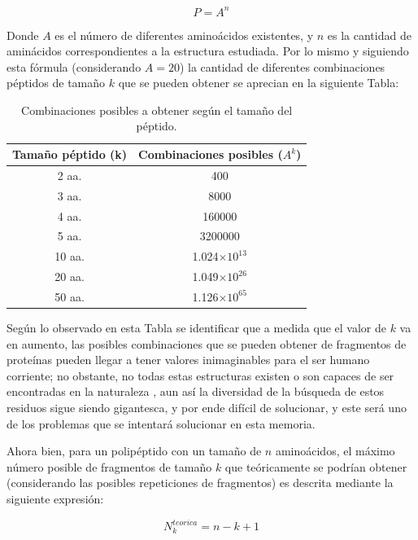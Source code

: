 \begin{equation}
P=A^{n}
\end{equation}

Donde $A$ es el número de diferentes aminoácidos existentes, y $n$ es la cantidad de aminácidos correspondientes a la estructura estudiada. Por lo mismo y siguiendo esta fórmula (considerando $A=20$) la cantidad de diferentes combinaciones péptidos de tamaño $k$ que se pueden obtener se aprecian en la siguiente Tabla:

\begin{table}[H]
\centering
\label{my-label2}
\begin{tabular}{|c|c|}
\hline
Tamaño péptido (k) & \multicolumn{1}{c|}{Combinaciones posibles ($A^{k}$)}  \\ \hline
2 aa.     & 400        \\
3 aa.     & 8000                         \\
4 aa.      &      160000                             \\
5 aa.      &   3200000       \\
10 aa.      &   1.024$\times 10^{13}$       \\
20 aa.      &   1.049$\times 10^{26}$       \\
50 aa.   &     1.126$\times 10^{65}$   \\ \hline
\end{tabular}
\caption{Combinaciones posibles a obtener según el tamaño del péptido.}
\end{table}

Según lo observado en esta Tabla se identificar que a medida que el valor de $k$ va en aumento, las posibles combinaciones que se pueden obtener de fragmentos de proteínas pueden llegar a tener valores inimaginables para el ser humano corriente; no obstante, no todas estas estructuras existen o son capaces de ser encontradas en la naturaleza \cite{array}, aun así la diversidad de la búsqueda de estos residuos sigue siendo gigantesca, y por ende difícil de solucionar, y este será uno de los problemas que se intentará solucionar en esta memoria.

Ahora bien, para un polipéptido con un tamaño de $n$ aminoácidos, el máximo número posible de fragmentos de tamaño $k$ que teóricamente se podrían obtener (considerando las posibles repeticiones de fragmentos) es descrita mediante la siguiente expresión:

\begin{equation}
N_{k}^{teorica}=n-k+1
\end{equation}

